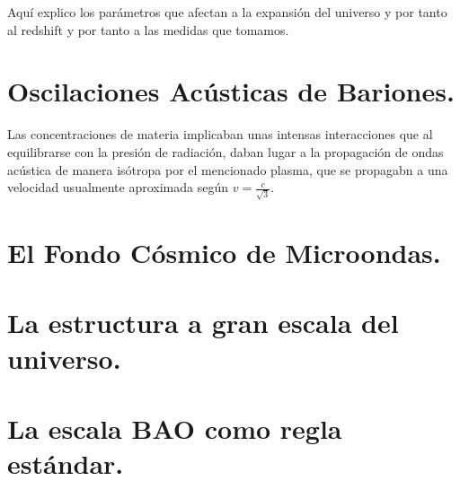 Aquí explico los parámetros que afectan a la expansión del universo y por tanto al redshift y por tanto a las medidas que tomamos.



\section{Oscilaciones Acústicas de Bariones.}
Las concentraciones de materia implicaban unas intensas interacciones que al equilibrarse con la presión de radiación, daban lugar a la propagación de ondas acústica de manera isótropa por el mencionado plasma, que se propagabn a una velocidad usualmente aproximada según $v = \frac{c}{\sqrt{3} }$. 

\section{El Fondo Cósmico de Microondas.}

\section{La estructura a gran escala del universo.}

\section{La escala BAO como regla estándar.}





